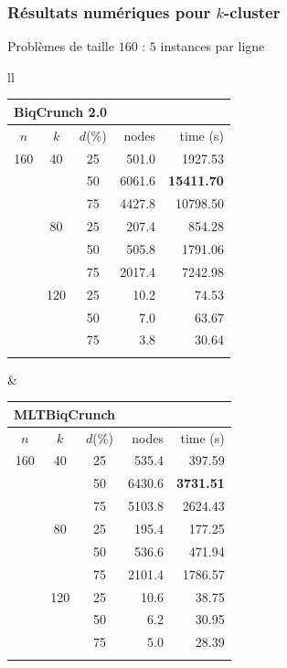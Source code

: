 \documentclass{beamer}
\begin{document}
\begin{frame}
\frametitle{Résultats numériques pour $k$-cluster}

\begin{block}{Problèmes de taille $160$ : $5$ instances par ligne}

\begin{tabular}{ll}
{\scriptsize
\begin{tabular}{cccrr}
\multicolumn{3}{c}{\alert{BiqCrunch 2.0}} & & \\
\hline\noalign{\smallskip}
$n$ & $k$ & $d$(\%) & nodes & time (s) \\
\noalign{\smallskip}\hline\noalign{\smallskip}
160 & 40 & 25 & 501.0 & 1927.53 \\
 & & 50 & 6061.6 & \textbf{15411.70} \\
 & & 75 & 4427.8 & 10798.50 \\
 & 80 & 25 & 207.4 & 854.28 \\
 & & 50 & 505.8 & 1791.06 \\
 & & 75 & 2017.4 & 7242.98 \\
 & 120 & 25 & 10.2 & 74.53 \\
 & & 50 & 7.0 & 63.67 \\
 & & 75 & 3.8 & 30.64 \\
\noalign{\smallskip}\hline
\end{tabular}
}
&
{\scriptsize
\begin{tabular}{cccrr}
\multicolumn{3}{c}{\alert{MLTBiqCrunch}} & & \\
\hline\noalign{\smallskip}
$n$ & $k$ & $d$(\%) & nodes & time (s) \\
\noalign{\smallskip}\hline\noalign{\smallskip}
160 & 40 & 25 & 535.4 & 397.59 \\
 & & 50 & 6430.6 & \textbf{3731.51} \\
 & & 75 & 5103.8 & 2624.43 \\
 & 80 & 25 & 195.4 & 177.25 \\
 & & 50 & 536.6 & 471.94 \\
 & & 75 & 2101.4 & 1786.57 \\
 & 120 & 25 & 10.6 & 38.75 \\
 & & 50 & 6.2 & 30.95 \\
 & & 75 & 5.0 & 28.39 \\
\noalign{\smallskip}\hline
\end{tabular}
}
\end{tabular}

\end{block}


\end{frame}
\end{document}
